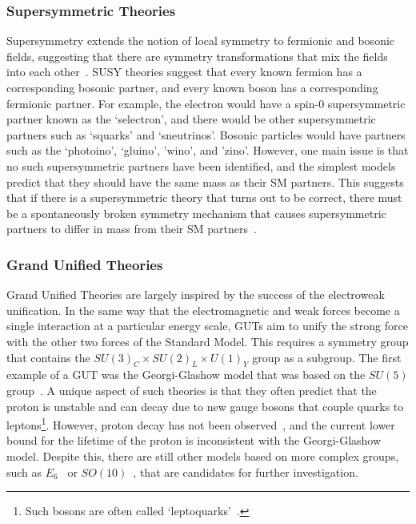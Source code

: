 \subsubsection{Supersymmetric Theories}

Supersymmetry extends the notion of local symmetry to fermionic and bosonic fields, suggesting that there are symmetry transformations that mix the fields into each other~\cite{Wess197452}.
SUSY theories suggest that every known fermion has a corresponding bosonic partner, and every known boson has a corresponding fermionic partner.
For example, the electron would have a spin-0 supersymmetric partner known as the `selectron', and there would be other supersymmetric partners such as `squarks' and `sneutrinos'.
Bosonic particles would have partners such as the `photoino', `gluino', 'wino', and 'zino'.
However, one main issue is that no such supersymmetric partners have been identified, and the simplest models predict that they should have the same mass as their SM partners.
This suggests that if there is a supersymmetric theory that turns out to be correct, there must be a spontaneously broken symmetry mechanism that causes supersymmetric partners to differ in mass from their SM partners~\cite{dine_2007}.

\subsubsection{Grand Unified Theories}

Grand Unified Theories are largely inspired by the success of the electroweak unification.
In the same way that the electromagnetic and weak forces become a single interaction at a particular energy scale, GUTs aim to unify the strong force with the other two forces of the Standard Model.
This requires a symmetry group that contains the $SU(3)_C\times SU(2)_L\times U(1)_Y$ group as a subgroup.
The first example of a GUT was the Georgi-Glashow model that was based on the $SU(5)$ group~\cite{PhysRevLett.32.438}.
A unique aspect of such theories is that they often predict that the proton is unstable and can decay due to new gauge bosons that couple quarks to leptons\footnote{Such bosons are often called `leptoquarks'~\cite{Diaz_2017}.}.
However, proton decay has not been observed~\cite{PhysRevLett.81.3319}, and the current lower bound for the lifetime of the proton is inconsistent with the Georgi-Glashow model.
Despite this, there are still other models based on more complex groups, such as $E_6$~\cite{Hewett1989193} or $SO(10)$~\cite{Cveti__1997}, that are candidates for further investigation.

